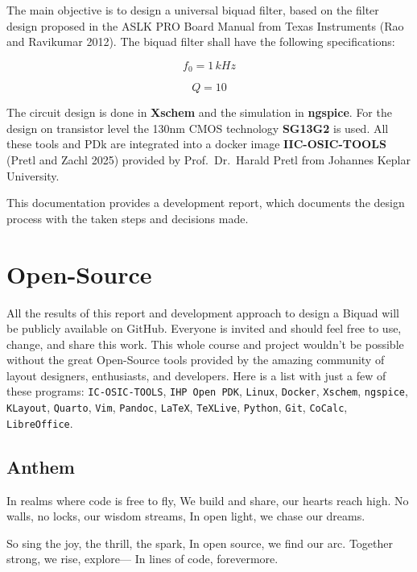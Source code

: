 \documentclass[
  letterpaper,
]{scrbook}
\begin{document}
The main objective is to design a universal biquad filter, based on the
filter design proposed in the ASLK PRO Board Manual from Texas
Instruments (Rao and Ravikumar 2012). The biquad filter shall have the
following specifications:

\[
f_0 = 1\,kHz
\]

\[
Q = 10
\]

The circuit design is done in \textbf{Xschem} and the simulation in
\textbf{ngspice}. For the design on transistor level the 130nm CMOS
technology \textbf{SG13G2} is used. All these tools and PDk are
integrated into a docker image \textbf{IIC-OSIC-TOOLS} (Pretl and Zachl
2025) provided by Prof.~Dr.~Harald Pretl from Johannes Keplar
University.

This documentation provides a development report, which documents the
design process with the taken steps and decisions made.

\section{Open-Source}\label{open-source}

All the results of this report and development approach to design a
Biquad will be publicly available on GitHub. Everyone is invited and
should feel free to use, change, and share this work. This whole course
and project wouldn't be possible without the great Open-Source tools
provided by the amazing community of layout designers, enthusiasts, and
developers. Here is a list with just a few of these programs:
\texttt{IC-OSIC-TOOLS}, \texttt{IHP\ Open\ PDK}, \texttt{Linux},
\texttt{Docker}, \texttt{Xschem}, \texttt{ngspice}, \texttt{KLayout},
\texttt{Quarto}, \texttt{Vim}, \texttt{Pandoc}, \texttt{LaTeX},
\texttt{TeXLive}, \texttt{Python}, \texttt{Git}, \texttt{CoCalc},
\texttt{LibreOffice}.

\subsection{Anthem}\label{anthem}

In realms where code is free to fly, We build and share, our hearts
reach high. No walls, no locks, our wisdom streams, In open light, we
chase our dreams.

So sing the joy, the thrill, the spark, In open source, we find our arc.
Together strong, we rise, explore--- In lines of code, forevermore.

\end{document}
